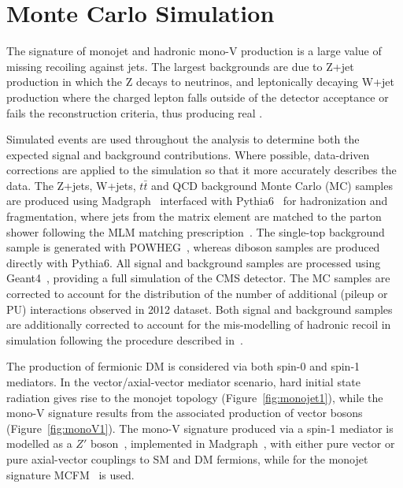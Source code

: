 \section{Monte Carlo Simulation}\label{sec:mcgen}
The signature of monojet and hadronic mono-V production is a large value of missing \ETm recoiling against jets. The largest backgrounds 
are due to Z+jet production in which the Z decays to neutrinos, and leptonically decaying W+jet production where the charged lepton falls 
outside of the detector acceptance or fails the reconstruction criteria, thus producing real \ETm.   

Simulated events are used throughout the analysis to determine both the expected signal and background contributions.
Where possible, data-driven corrections are applied to the simulation so that it more accurately describes the data.
The Z+jets, W+jets, $t\bar{t}$ and QCD background Monte Carlo (MC) samples are produced using Madgraph~\cite{amcatnlo} interfaced with Pythia6~\cite{Sjostrand:2006za} for hadronization and 
fragmentation, where jets from the matrix element are matched to the parton shower following the MLM matching prescription~\cite{Mangano:2006rw}. 
The single-top background sample is generated with POWHEG~\cite{powheg},  
whereas diboson samples are produced directly with Pythia6.  
All signal and background samples are processed using Geant4~\cite{geant4}, providing a full simulation of the CMS detector.  
The MC samples are corrected to account for the distribution of the number of additional (pileup or PU) interactions 
observed in 2012 dataset. Both signal and background samples are additionally corrected to account for the mis-modelling of hadronic recoil in simulation following 
the procedure described in~\cite{CMS-PAS-JME-12-002}.

The production of fermionic DM is considered via both spin-0 and spin-1 mediators. In the vector/axial-vector mediator scenario, hard initial state radiation gives 
rise to the monojet topology (Figure~\ref{fig:monojet1}), while the mono-V signature results from the associated production of vector bosons 
(Figure~\ref{fig:monoV1}). The mono-V signature produced via a spin-1 mediator is modelled as a $Z'$ boson~\cite{zprimemodel}, implemented in Madgraph~\cite{amcatnlo}, 
with either pure vector or pure axial-vector couplings to SM and DM fermions, while for the monojet signature MCFM~\cite{mcfm} is used. 


